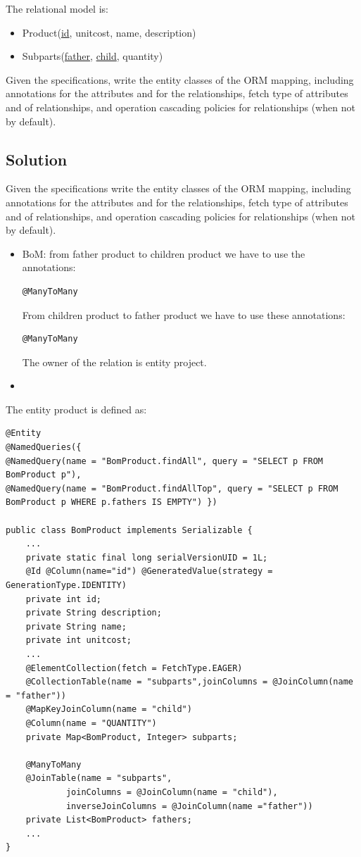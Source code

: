 The relational model is: 
\begin{itemize}
    \item Product(\underline{id}, unitcost, name, description)
    \item Subparts(\underline{father}, \underline{child}, quantity)
\end{itemize}
Given the specifications, write the entity classes of the ORM mapping, including annotations for the attributes and for the relationships, fetch type of attributes and of relationships, and operation cascading policies for relationships (when not by default).

\subsection*{Solution}
Given the specifications write the entity classes of the ORM mapping, including annotations for the attributes and for the relationships, fetch type of attributes and of relationships, and operation cascading policies for relationships (when not by default). 
\begin{itemize}
    \item BoM: from father product to children product we have to use the annotations: 
        \begin{lstlisting}[style=Java]
@ManyToMany
        \end{lstlisting}
        From children product to father product we have to use these annotations: 
        \begin{lstlisting}[style=Java]
@ManyToMany
        \end{lstlisting}
        The owner of the relation is entity project. 
    \item 
\end{itemize}
The entity product is defined as:  
    \begin{lstlisting}[style=Java]
@Entity
@NamedQueries({
@NamedQuery(name = "BomProduct.findAll", query = "SELECT p FROM BomProduct p"),
@NamedQuery(name = "BomProduct.findAllTop", query = "SELECT p FROM BomProduct p WHERE p.fathers IS EMPTY") })

public class BomProduct implements Serializable {
    ...
    private static final long serialVersionUID = 1L;
    @Id @Column(name="id") @GeneratedValue(strategy = GenerationType.IDENTITY)
    private int id;
    private String description;
    private String name;
    private int unitcost;
    ...
    @ElementCollection(fetch = FetchType.EAGER)
    @CollectionTable(name = "subparts",joinColumns = @JoinColumn(name = "father"))
    @MapKeyJoinColumn(name = "child")
    @Column(name = "QUANTITY")
    private Map<BomProduct, Integer> subparts;

    @ManyToMany
    @JoinTable(name = "subparts",
            joinColumns = @JoinColumn(name = "child"),
            inverseJoinColumns = @JoinColumn(name ="father"))
    private List<BomProduct> fathers;
    ...            
}
    \end{lstlisting}

